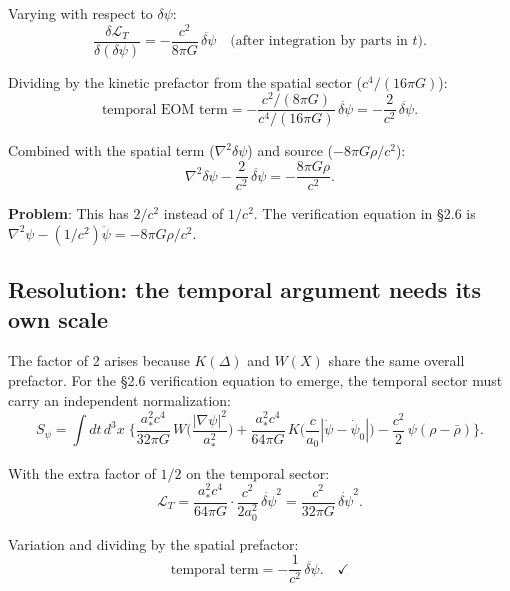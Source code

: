 \documentclass[aps,prd,twocolumn,nofootinbib]{revtex4-2}
\begin{document}
Varying with respect to $\delta\psi$:
\begin{equation}
\frac{\delta\mathcal{L}_T}{\delta(\delta\psi)}
= -\frac{c^2}{8\pi G}\,\ddot{\delta\psi}
\quad\text{(after integration by parts in $t$)}.
\end{equation}

Dividing by the kinetic prefactor from the spatial sector
($c^4/(16\pi G)$):
\begin{equation}
\text{temporal EOM term} = -\frac{c^2/(8\pi G)}{c^4/(16\pi G)}\,\ddot{\delta\psi}
= -\frac{2}{c^2}\,\ddot{\delta\psi}.
\end{equation}

Combined with the spatial term ($\nabla^2\delta\psi$) and source
($-8\pi G\rho/c^2$):
\begin{equation}
\nabla^2\delta\psi - \frac{2}{c^2}\,\ddot{\delta\psi} = -\frac{8\pi G\rho}{c^2}.
\end{equation}

\textbf{Problem}: This has $2/c^2$ instead of $1/c^2$. The verification
equation in \S2.6 is $\nabla^2\psi - (1/c^2)\ddot\psi = -8\pi G\rho/c^2$.

\subsection{Resolution: the temporal argument needs its own scale}

The factor of 2 arises because $K(\Delta)$ and $W(X)$ share the same
overall prefactor. For the \S2.6 verification equation to emerge, the
temporal sector must carry an independent normalization:
\begin{equation}
\boxed{
S_\psi = \int dt\,d^3x\;\Biggl\{
  \frac{a_*^2 c^4}{32\pi G}\,
    W\!\biggl(\frac{|\nabla\psi|^2}{a_*^2}\biggr)
  + \frac{a_*^2 c^4}{64\pi G}\,
    K\!\biggl(\frac{c}{a_0}|\dot\psi - \dot\psi_0|\biggr)
  - \frac{c^2}{2}\,\psi(\rho - \bar\rho)
\Biggr\}.
}
\label{eq:action-final}
\end{equation}

With the extra factor of $1/2$ on the temporal sector:
\begin{equation}
\mathcal{L}_T = \frac{a_*^2 c^4}{64\pi G}\cdot\frac{c^2}{2a_0^2}\,
\dot{\delta\psi}^2
= \frac{c^2}{32\pi G}\,\dot{\delta\psi}^2.
\end{equation}

Variation and dividing by the spatial prefactor:
\begin{equation}
\text{temporal term} = -\frac{1}{c^2}\,\ddot{\delta\psi}. \quad\checkmark
\end{equation}
\end{document}
